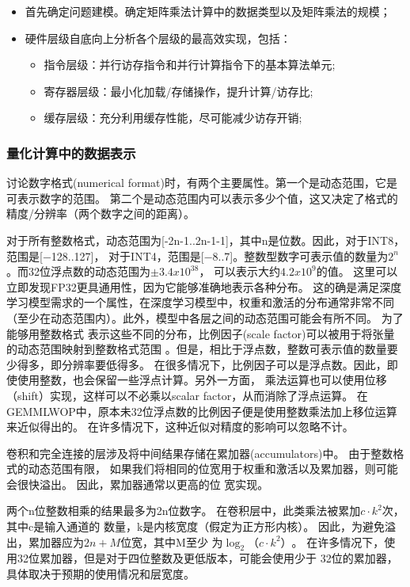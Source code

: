 \begin{itemize}
  \item 首先确定问题建模。确定矩阵乘法计算中的数据类型以及矩阵乘法的规模；
  \item 硬件层级自底向上分析各个层级的最高效实现，包括： 
    \begin{itemize}
      \item 指令层级：并行访存指令和并行计算指令下的基本算法单元;
      \item 寄存器层级：最小化加载/存储操作，提升计算/访存比;
      \item 缓存层级：充分利用缓存性能，尽可能减少访存开销;
   \end{itemize}
\end{itemize}

\subsubsection{量化计算中的数据表示}

讨论数字格式(numerical format)时，有两个主要属性。第一个是动态范围，它是可表示数字的范围。
第二个是动态范围内可以表示多少个值，这又决定了格式的精度/分辨率（两个数字之间的距离）。

对于所有整数格式，动态范围为[-2n-1..2n-1-1]，其中n是位数。因此，对于INT8，范围是[−128..127]，
对于INT4，范围是[−8..7]。整数型数字可表示值的数量为$2^n$。而32位浮点数的动态范围为$\pm3.4 x 10^38$，
可以表示大约$4.2 x 10^9$的值。 这里可以立即发现FP32更具通用性，因为它能够准确地表示各种分布。
这的确是满足深度学习模型需求的一个属性，在深度学习模型中，权重和激活的分布通常非常不同
（至少在动态范围内）。此外，模型中各层之间的动态范围可能会有所不同。 为了能够用整数格式
表示这些不同的分布，比例因子(scale factor)可以被用于将张量的动态范围映射到整数格式范围
。但是，相比于浮点数，整数可表示值的数量要少得多，即分辨率要低得多。
在很多情况下，比例因子可以是浮点数。因此，即使使用整数，也会保留一些浮点计算。另外一方面，
乘法运算也可以使用位移（shift）实现，这样可以不必乘以scalar factor，从而消除了浮点运算。
在GEMMLWOP中，原本未32位浮点数的比例因子便是使用整数乘法加上移位运算来近似得出的。
在许多情况下，这种近似对精度的影响可以忽略不计。

卷积和完全连接的层涉及将中间结果存储在累加器(accumulators)中。 由于整数格式的动态范围有限，
如果我们将相同的位宽用于权重和激活以及累加器，则可能会很快溢出。 因此，累加器通常以更高的位
宽实现。

两个n位整数相乘的结果最多为2n位数字。 在卷积层中，此类乘法被累加$c·k^2$次，其中c是输入通道的
数量，k是内核宽度（假定为正方形内核）。 因此，为避免溢出，累加器应为$2n + M$位宽，其中M至少
为$\log_2（c⋅k^2）$。 在许多情况下，使用32位累加器，但是对于四位整数及更低版本，可能会使用少于
32位的累加器，具体取决于预期的使用情况和层宽度。


